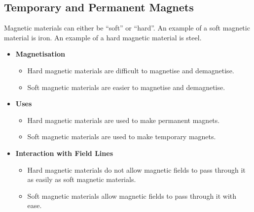 \documentclass[../main.tex]{subfiles}
\begin{document}
	\subsection{Temporary and Permanent Magnets}
	Magnetic materials can either be ``soft'' or ``hard''. An example of a soft magnetic material is iron. An example of a hard magnetic material is steel.
	\begin{itemize}
		\item \textbf{Magnetisation} \begin{itemize}
			\item Hard magnetic materials are difficult to magnetise and demagnetise.
			\item Soft magnetic materials are easier to magnetise and demagnetise.
		\end{itemize}
		\item \textbf{Uses} \begin{itemize}
			\item Hard magnetic materials are used to make permanent magnets.
			\item Soft magnetic materials are used to make temporary magnets.
		\end{itemize}
		\item \textbf{Interaction with Field Lines} \begin{itemize}
			\item Hard magnetic materials do not allow magnetic fields to pass through it as easily as soft magnetic materials.
			\item Soft magnetic materials allow magnetic fields to pass through it with ease.
		\end{itemize}
	\end{itemize}
\end{document}
